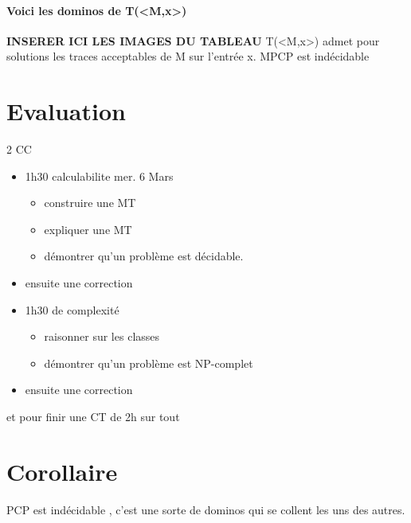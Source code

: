 \documentclass{article}
\begin{document}
{{\paragraph{Voici les dominos de T(<M,x>)}
\textbf{INSERER ICI LES IMAGES DU TABLEAU}
T(<M,x>) admet pour solutions les traces acceptables de M sur l'entrée x. MPCP est indécidable


\section{Evaluation}
2 CC
\begin{itemize}
\item 1h30 calculabilite mer. 6 Mars
\begin{itemize}
\item construire une MT
\item expliquer une MT
\item démontrer qu'un problème est décidable.
\end{itemize}
\item ensuite une correction
\item 1h30 de complexité
\begin{itemize}
\item raisonner sur les classes
\item démontrer qu'un problème est NP-complet
\end{itemize}
\item ensuite une correction

\end{itemize}
et pour finir une CT de 2h sur tout
\newpage
\section{Corollaire} PCP est indécidable , c'est une sorte de dominos qui se collent les uns des autres.\\\\
}}
\end{document}
